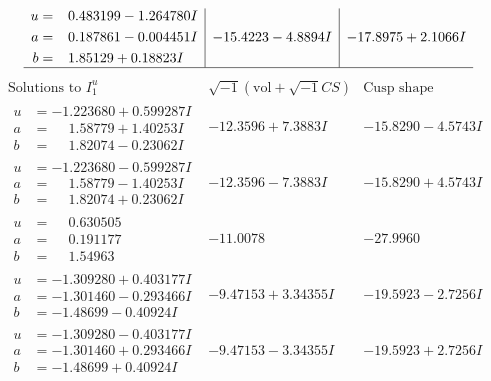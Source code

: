 \documentclass[1p]{elsarticle_modified}
\theoremstyle{definition}
\newcommand{\I}{\sqrt{-1}}
\begin{document}
$$\begin{array}{c|c|c}
\begin{aligned}
u &= \phantom{-}0.483199 - 1.264780 I \\
a &= \phantom{-}0.187861 - 0.004451 I \\
b &= \phantom{-}1.85129 + 0.18823 I\end{aligned}
 & -15.4223 - 4.8894 I & -17.8975 + 2.1066 I\\
 \hline 
 \end{array}$$\newpage$$\begin{array}{c|c|c}  
\text{Solutions to }I^u_{1}& \I (\text{vol} + \sqrt{-1}CS) & \text{Cusp shape}\\
 \hline 
\begin{aligned}
u &= -1.223680 + 0.599287 I \\
a &= \phantom{-}1.58779 + 1.40253 I \\
b &= \phantom{-}1.82074 - 0.23062 I\end{aligned}
 & -12.3596 + 7.3883 I & -15.8290 - 4.5743 I \\ \hline\begin{aligned}
u &= -1.223680 - 0.599287 I \\
a &= \phantom{-}1.58779 - 1.40253 I \\
b &= \phantom{-}1.82074 + 0.23062 I\end{aligned}
 & -12.3596 - 7.3883 I & -15.8290 + 4.5743 I \\ \hline\begin{aligned}
u &= \phantom{-}0.630505\phantom{ +0.000000I} \\
a &= \phantom{-}0.191177\phantom{ +0.000000I} \\
b &= \phantom{-}1.54963\phantom{ +0.000000I}\end{aligned}
 & -11.0078\phantom{ +0.000000I} & -27.9960\phantom{ +0.000000I} \\ \hline\begin{aligned}
u &= -1.309280 + 0.403177 I \\
a &= -1.301460 - 0.293466 I \\
b &= -1.48699 - 0.40924 I\end{aligned}
 & -9.47153 + 3.34355 I & -19.5923 - 2.7256 I \\ \hline\begin{aligned}
u &= -1.309280 - 0.403177 I \\
a &= -1.301460 + 0.293466 I \\
b &= -1.48699 + 0.40924 I\end{aligned}
 & -9.47153 - 3.34355 I & -19.5923 + 2.7256 I \\ \hline\begin{aligned}

\end{aligned}
\end{array}$$
\end{document}
